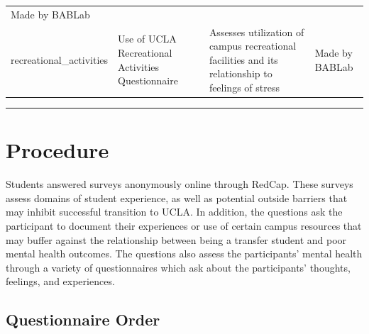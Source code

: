\documentclass[]{book}
\begin{document}
\begin{longtable}[]{@{}llll@{}}
\begin{minipage}[t]{0.18\columnwidth}
Made by BABLab\strut
\end{minipage}\tabularnewline
\begin{minipage}[t]{0.22\columnwidth}\raggedright
recreational\_activities\strut
\end{minipage} & \begin{minipage}[t]{0.27\columnwidth}\raggedright
Use of UCLA Recreational Activities Questionnaire\strut
\end{minipage} & \begin{minipage}[t]{0.22\columnwidth}\raggedright
Assesses utilization of campus recreational facilities and its relationship to feelings of stress\strut
\end{minipage} & \begin{minipage}[t]{0.18\columnwidth}\raggedright
Made by BABLab\strut
\end{minipage}\tabularnewline
\bottomrule
\end{longtable}

\begin{center}\rule{0.5\linewidth}{0.5pt}\end{center}

\hypertarget{procedure}{%
\section{Procedure}\label{procedure}}

Students answered surveys anonymously online through RedCap. These surveys assess domains of student experience, as well as potential outside barriers that may inhibit successful transition to UCLA. In addition, the questions ask the participant to document their experiences or use of certain campus resources that may buffer against the relationship between being a transfer student and poor mental health outcomes. The questions also assess the participants' mental health through a variety of questionnaires which ask about the participants' thoughts, feelings, and experiences.

\hypertarget{questionnaire-order}{%
\subsection{Questionnaire Order}\label{questionnaire-order}}
\end{document}
